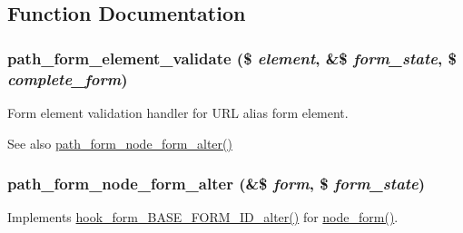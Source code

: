 \subsection{Function Documentation}
\hypertarget{path_8module_a6bf1b7c5d98d593f2ca89b3f2eb199fe}{
\subsubsection[{path\_\-form\_\-element\_\-validate}]{\setlength{\rightskip}{0pt plus 5cm}path\_\-form\_\-element\_\-validate (\$ {\em element}, \/  \&\$ {\em form\_\-state}, \/  \$ {\em complete\_\-form})}}
\label{path_8module_a6bf1b7c5d98d593f2ca89b3f2eb199fe}
Form element validation handler for URL alias form element.

\begin{DoxySeeAlso}{See also}
\hyperlink{path_8module_a00820fa0737926aa9d5aa1852cac785f}{path\_\-form\_\-node\_\-form\_\-alter()} 
\end{DoxySeeAlso}
\hypertarget{path_8module_a00820fa0737926aa9d5aa1852cac785f}{
\subsubsection[{path\_\-form\_\-node\_\-form\_\-alter}]{\setlength{\rightskip}{0pt plus 5cm}path\_\-form\_\-node\_\-form\_\-alter (\&\$ {\em form}, \/  \$ {\em form\_\-state})}}
\label{path_8module_a00820fa0737926aa9d5aa1852cac785f}
Implements \hyperlink{group__hooks_gaf0cfc224a88c8823da68856c30a4841a}{hook\_\-form\_\-BASE\_\-FORM\_\-ID\_\-alter()} for \hyperlink{group__forms_ga267299500e205db099ee4e8396769d3f}{node\_\-form()}.

